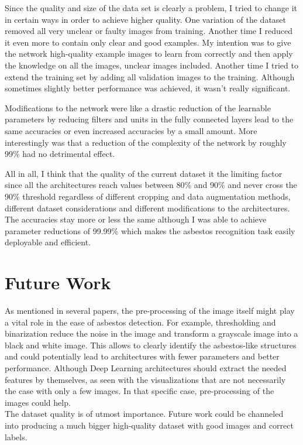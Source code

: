 Since the quality and size of the data set is clearly a problem, I tried to change it in certain ways in order to achieve higher quality. One variation of the dataset removed all very unclear or faulty images from training. Another time I reduced it even more to contain only clear and good examples. My intention was to give the network high-quality example images to learn from correctly and then apply the knowledge on all the images, unclear images included. Another time I tried to extend the training set by adding all validation images to the training. Although sometimes slightly better performance was achieved, it wasn't really significant.

Modifications to the network were like a drastic reduction of the learnable parameters by reducing filters and units in the fully connected layers lead to the same accuracies or even increased accuracies by a small amount. More interestingly was that a reduction of the complexity of the network by roughly 99\% had no detrimental effect.

All in all, I think that the quality of the current dataset it the limiting factor since all the architectures reach values between 80\% and 90\% and never cross the 90\% threshold regardless of different cropping and data augmentation methods, different dataset considerations and different modifications to the architectures. The accuracies stay more or less the same although I was able to achieve parameter reductions of 99.99\% which makes the asbestos recognition task easily deployable and efficient.

\section{Future Work}

As mentioned in several papers, the pre-processing of the image itself might play a vital role in the ease of asbestos detection. For example, thresholding and binarization reduce the noise in the image and transform a grayscale image into a black and white image. This allows to clearly identify the asbestos-like structures and could potentially lead to architectures with fewer parameters and better performance. Although Deep Learning architectures should extract the needed features by themselves, as seen with the visualizations that are not necessarily the case with only a few images. In that specific case, pre-processing of the images could help.\\

The dataset quality is of utmost importance. Future work could be channeled into producing a much bigger high-quality dataset with good images and correct labels.\\

